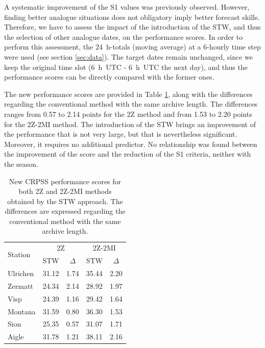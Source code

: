 \documentclass[hess]{copernicus}
\begin{document}
A systematic improvement of the S1 values was previously observed. However, finding better analogue situations does not obligatory imply better forecast skills. Therefore, we have to assess the impact of the introduction of the STW, and thus the selection of other analogue dates, on the performance scores. In order to perform this assessment, the 24~h-totals (moving average) at a 6-hourly time step were used (see section \ref{sec:data}). The target dates remain unchanged, since we keep the original time slot (6~h~UTC - 6~h~UTC the next day), and thus the performance scores can be directly compared with the former ones.

The new performance scores are provided in Table \ref{table:CRPSS_STW}, along with the differences regarding the conventional method with the same archive length. The differences ranges from 0.57 to 2.14 points for the 2Z method and from 1.53 to 2.20 points for the 2Z-2MI method. The introduction of the STW brings an improvement of the performance that is not very large, but that is nevertheless significant. Moreover, it requires no additional predictor. No relationship was found between the improvement of the score and the reduction of the S1 criteria, neither with the season.

\begin{table}[htb]
	\caption{New CRPSS performance scores for both 2Z and 2Z-2MI methods obtained by the STW approach. The differences are expressed regarding the conventional method with the same archive length.}
	\begin{center}
		\begin{tabular}{l c c c c}
			\hline
			\multirow{2}{*}{Station} & \multicolumn{2}{c}{2Z} & \multicolumn{ 2}{c}{2Z-2MI} \\
			& STW & $\Delta$ & STW & $\Delta$ \\
			\hline
			Ulrichen & 31.12 & 1.74 & 35.44 & 2.20 \\
			Zermatt & 24.34 & 2.14 & 28.92 & 1.97 \\
			Visp & 24.39 & 1.16 & 29.42 & 1.64 \\
			Montana & 31.59 & 0.80 & 36.30 & 1.53 \\
			Sion & 25.35 & 0.57 & 31.07 & 1.71 \\
			Aigle & 31.78 & 1.21 & 38.11 & 2.16 \\ 
			\hline
		\end{tabular}
	\end{center}
	\label{table:CRPSS_STW}
\end{table}
\end{document}
